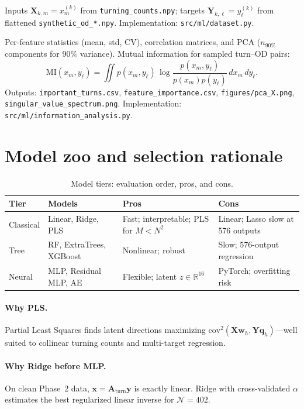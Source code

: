 \documentclass[11pt,a4paper]{report}
\newcommand{\mathbfy}{\mathbf{y}}
\newcommand{\mathbfx}{\mathbf{x}}
\newcommand{\mathbfX}{\mathbf{X}}
\newcommand{\mathbfY}{\mathbf{Y}}
\newcommand{\Aturn}{\mathbf{A}_{\mathrm{turn}}}
\newcommand{\mathbfw}{\mathbf{w}}
\newcommand{\mathbfq}{\mathbf{q}}
\begin{document}
Inputs $\mathbfX_{k,m}=x_m^{(k)}$ from \texttt{turning\_counts.npy}; targets $\mathbfY_{k,\ell}=y_\ell^{(k)}$ from flattened \texttt{synthetic\_od\_*.npy}. Implementation: \texttt{src/ml/dataset.py}.

Per-feature statistics (mean, std, CV), correlation matrices, and PCA ($n_{90\%}$ components for 90\% variance). Mutual information for sampled turn--OD pairs:
\begin{equation}
    \mathrm{MI}(x_m, y_\ell) = \iint p(x_m,y_\ell)\,\log\frac{p(x_m,y_\ell)}{p(x_m)p(y_\ell)}\,dx_m\,dy_\ell.
\end{equation}
Outputs: \texttt{important\_turns.csv}, \texttt{feature\_importance.csv}, \texttt{figures/pca\_X.png}, \texttt{singular\_value\_spectrum.png}. Implementation: \texttt{src/ml/information\_analysis.py}.


\section{Model zoo and selection rationale}
\label{sec:ch3-models}

\begin{table}[ht]
\centering
\caption{Model tiers: evaluation order, pros, and cons.}
\label{tab:model_order}
\footnotesize
\begin{tabular}{@{}p{2.2cm}p{2.8cm}p{3.8cm}p{3.8cm}@{}}
\toprule
\textbf{Tier} & \textbf{Models} & \textbf{Pros} & \textbf{Cons} \\
\midrule
Classical & Linear, Ridge, PLS & Fast; interpretable; PLS for $M<N^2$ & Linear; Lasso slow at 576 outputs \\
Tree & RF, ExtraTrees, XGBoost & Nonlinear; robust & Slow; 576-output regression \\
Neural & MLP, Residual MLP, AE & Flexible; latent $z\in\mathbb{R}^{16}$ & PyTorch; overfitting risk \\
\bottomrule
\end{tabular}
\end{table}

\paragraph{Why PLS.}
Partial Least Squares finds latent directions maximizing $\mathrm{cov}^2(\mathbfX\mathbfw_h,\mathbfY\mathbfq_h)$---well suited to collinear turning counts and multi-target regression.

\paragraph{Why Ridge before MLP.}
On clean Phase~2 data, $\mathbfx=\Aturn\mathbfy$ is exactly linear. Ridge with cross-validated $\alpha$ estimates the best regularized linear inverse for $\mathcal{N}=402$.
\end{document}
